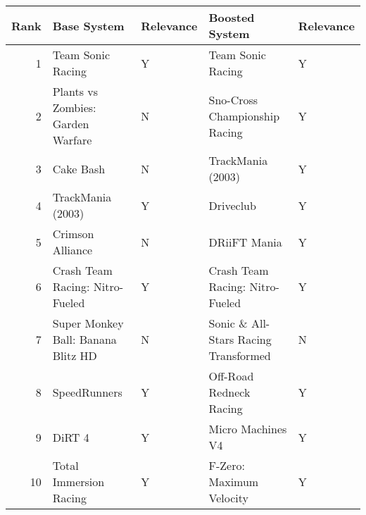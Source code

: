 \begin{tabular}{rllll}
\toprule
 Rank &                        Base System & Relevance &                       Boosted System & Relevance \\
\midrule
    1 &                  Team Sonic Racing &         Y &                    Team Sonic Racing &         Y \\
    2 &  Plants vs Zombies: Garden Warfare &         N &        Sno-Cross Championship Racing &         Y \\
    3 &                          Cake Bash &         N &                    TrackMania (2003) &         Y \\
    4 &                  TrackMania (2003) &         Y &                            Driveclub &         Y \\
    5 &                   Crimson Alliance &         N &                         DRiiFT Mania &         Y \\
    6 &    Crash Team Racing: Nitro-Fueled &         Y &      Crash Team Racing: Nitro-Fueled &         Y \\
    7 & Super Monkey Ball: Banana Blitz HD &         N & Sonic \& All-Stars Racing Transformed &         N \\
    8 &                       SpeedRunners &         Y &              Off-Road Redneck Racing &         Y \\
    9 &                             DiRT 4 &         Y &                    Micro Machines V4 &         Y \\
   10 &             Total Immersion Racing &         Y &             F-Zero: Maximum Velocity &         Y \\
\bottomrule
\end{tabular}
